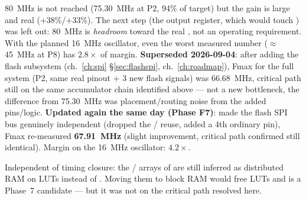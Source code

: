 \begin{fnnote}
80~MHz is not reached (75.30~MHz at P2, 94\% of target) but the gain is large and real
($+38\%$/$+33\%$). The next step (the  output register, which would touch
) was left out: 80~MHz is \emph{headroom} toward the real , not
an operating requirement. With the planned 16~MHz oscillator, even the worst measured number
($\approx$45~MHz at P8) has $2.8\times$ of margin.
\textbf{Superseded 2026-09-04}: after adding the flash subsystem (ch.~\ref{ch:spi}
§\ref{sec:flashspi}, ch.~\ref{ch:roadmap}), Fmax for the full system (P2, same real pinout +
3 new flash signals) was 66.68~MHz, critical path still on the same
 accumulator chain identified above --- not a new bottleneck, the
difference from 75.30~MHz was placement/routing noise from the added pins/logic.
\textbf{Updated again the same day (Phase F7)}: made the flash SPI bus genuinely
independent (dropped the / reuse, added a 4th ordinary
 pin), Fmax re-measured \textbf{67.91~MHz} (slight improvement, critical
path confirmed still identical). Margin on the 16~MHz oscillator: $4.2\times$.
\end{fnnote}

\begin{fnnote}
Independent of timing closure: the / arrays of 
are still inferred as distributed RAM on LUTs instead of . Moving them to block
RAM would free LUTs and is a Phase~7 candidate --- but it was not on the critical path
resolved here.
\end{fnnote}

